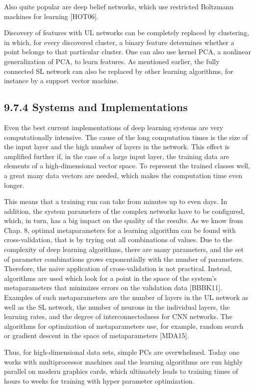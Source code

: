 \documentclass[10pt]{article}
\begin{document}
Also quite popular are deep belief networks, which use restricted Boltzmann machines for learning [HOT06].

Discovery of features with UL networks can be completely replaced by clustering, in which, for every discovered cluster, a binary feature determines whether a point belongs to that particular cluster. One can also use kernel PCA, a nonlinear generalization of PCA, to learn features. As mentioned earlier, the fully connected SL network can also be replaced by other learning algorithms, for instance by a support vector machine.

\subsection*{9.7.4 Systems and Implementations}
Even the best current implementations of deep learning systems are very computationally intensive. The cause of the long computation times is the size of the input layer and the high number of layers in the network. This effect is amplified further if, in the case of a large input layer, the training data are elements of a high-dimensional vector space. To represent the trained classes well, a great many data vectors are needed, which makes the computation time even longer.


This means that a training run can take from minutes up to even days. In addition, the system parameters of the complex networks have to be configured, which, in turn, has a big impact on the quality of the results. As we know from Chap. 8, optimal metaparameters for a learning algorithm can be found with cross-validation, that is by trying out all combinations of values. Due to the complexity of deep learning algorithms, there are many parameters, and the set of parameter combinations grows exponentially with the number of parameters. Therefore, the naive application of cross-validation is not practical. Instead, algorithms are used which look for a point in the space of the system's metaparameters that minimizes errors on the validation data [BBBK11]. Examples of such metaparameters are the number of layers in the UL network as well as the SL network, the number of neurons in the individual layers, the learning rates, and the degree of interconnectedness for CNN networks. The algorithms for optimization of metaparameters use, for example, random search or gradient descent in the space of metaparameters [MDA15].

Thus, for high-dimensional data sets, simple PCs are overwhelmed. Today one works with multiprocessor machines and the learning algorithms are run highly parallel on modern graphics cards, which ultimately leads to training times of hours to weeks for training with hyper parameter optimization.
\end{document}
